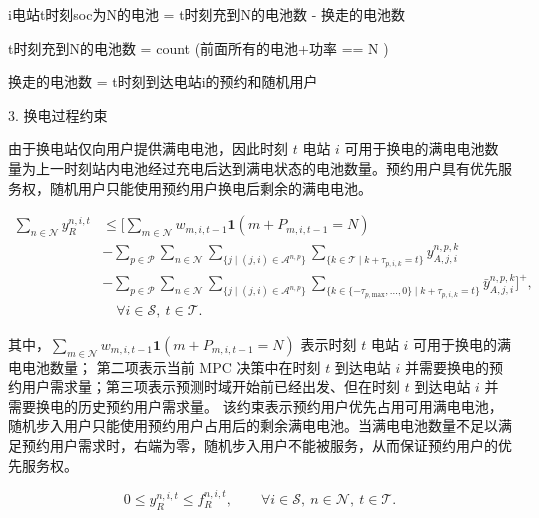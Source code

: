 \documentclass[12pt,hyperref,a4paper,UTF8]{ctexart}
\begin{document}
i电站t时刻soc为N的电池 = t时刻充到N的电池数 - 换走的电池数

t时刻充到N的电池数 = count (前面所有的电池+功率 == N )

换走的电池数 = t时刻到达电站i的预约和随机用户


3. 换电过程约束

由于换电站仅向用户提供满电电池，因此时刻 $t$ 电站 $i$ 可用于换电的满电电池数量为上一时刻站内电池经过充电后达到满电状态的电池数量。预约用户具有优先服务权，随机用户只能使用预约用户换电后剩余的满电电池。

\begin{equation}
\begin{aligned}
\sum_{n\in \mathcal{N}} y^{n,i,t}_{R}
&\le
\biggl[
\sum_{m\in \mathcal{N}} w_{m,i,t-1}
\mathbf{1}\!\left(m+P_{m,i,t-1}=N\right) \\
&-
\sum_{p\in \mathcal{P}}
\sum_{n\in \mathcal{N}}
\sum_{\{j\mid (j,i)\in \mathcal{A}^{n,p}\}}
\sum_{\{k\in \mathcal{T}\mid k+\tau_{p,i,k}=t\}}
y^{n,p,k}_{A,j,i} \\
&-
\sum_{p\in \mathcal{P}}
\sum_{n\in \mathcal{N}}
\sum_{\{j\mid (j,i)\in \mathcal{A}^{n,p}\}}
\sum_{\{k\in \{-\tau_{p,\mathrm{max}},\ldots,0\}\mid k+\tau_{p,i,k}=t\}}
\bar{y}^{n,p,k}_{A,j,i}\biggr]^+, \\
&\quad \forall i\in \mathcal{S},\ t\in \mathcal{T}.
\end{aligned}
\tag{8a}
\end{equation}

其中，$\sum_{m\in \mathcal{N}} w_{m,i,t-1}\mathbf{1}(m+P_{m,i,t-1}=N)$ 表示时刻 $t$ 电站 $i$ 可用于换电的满电电池数量；
第二项表示当前 MPC 决策中在时刻 $t$ 到达电站 $i$ 并需要换电的预约用户需求量；第三项表示预测时域开始前已经出发、但在时刻 $t$ 到达电站 $i$ 并需要换电的历史预约用户需求量。
该约束表示预约用户优先占用可用满电电池，随机步入用户只能使用预约用户占用后的剩余满电电池。当满电电池数量不足以满足预约用户需求时，右端为零，随机步入用户不能被服务，从而保证预约用户的优先服务权。


\begin{equation}
0\le y^{n,i,t}_{R}\le f^{n,i,t}_{R},
\qquad
\forall i\in \mathcal{S},\ n\in \mathcal{N},\ t\in \mathcal{T}.
\tag{8b}
\end{equation}
\end{document}

